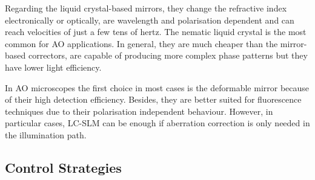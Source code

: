 Regarding the liquid crystal-based mirrors, they change the refractive index electronically or optically, are wavelength and polarisation dependent and can reach velocities of just a few tens of hertz. The nematic liquid crystal is the most common for AO applications. In general, they are much cheaper than the mirror-based correctors, are capable of producing more complex phase patterns but they have lower light efficiency.   

In AO microscopes the first choice in most cases is the deformable mirror because of their high detection efficiency. Besides, they are better suited for fluorescence techniques due to their polarisation independent behaviour. However, in particular cases, LC-SLM can be enough if aberration correction is only needed in the illumination path.

\subsection{Control Strategies}
\label{sec:ControlStrategies}